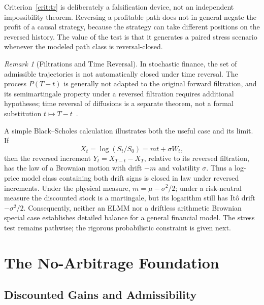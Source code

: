 \documentclass[aps,pra,reprint,superscriptaddress,amsmath,amssymb,floatfix]{revtex4-2}
\theoremstyle{plain}
\theoremstyle{definition}
\theoremstyle{remark}
\newtheorem{remark}{Remark}
\begin{document}
Criterion~\ref{crit:tr} is deliberately a falsification device, not an
independent impossibility theorem. Reversing a profitable path does not in
general negate the profit of a causal strategy, because the strategy can take
different positions on the reversed history. The value of the test is that it
generates a paired stress scenario whenever the modeled path class is
reversal-closed.

\begin{remark}[Filtrations and Time Reversal]
In stochastic finance, the set of admissible trajectories is not automatically
closed under time reversal. The process \(P(T-t)\) is generally not adapted to
the original forward filtration, and its semimartingale property under a
reversed filtration requires additional hypotheses; time reversal of
diffusions is a separate theorem, not a formal substitution
\(t\mapsto T-t\)~\cite{HaussmannPardoux1986}.

A simple Black--Scholes calculation illustrates both the useful case and its
limit. If
\[
  X_t=\log(S_t/S_0)=mt+\sigma W_t,
\]
then the reversed increment \(Y_t=X_{T-t}-X_T\), relative to its reversed
filtration, has the law of a Brownian motion with drift \(-m\) and volatility
\(\sigma\). Thus a log-price model class containing both drift signs is closed
in law under reversed increments. Under the physical measure,
\(m=\mu-\sigma^2/2\); under a risk-neutral measure the discounted stock is a
martingale, but its logarithm still has It\^o drift \(-\sigma^2/2\).
Consequently, neither an ELMM nor a driftless arithmetic Brownian special case
establishes detailed balance for a general financial model. The stress test
remains pathwise; the rigorous probabilistic constraint is given next.
\end{remark}

\section{The No-Arbitrage Foundation}
\label{sec:noarb}

\subsection{Discounted Gains and Admissibility}
\end{document}
